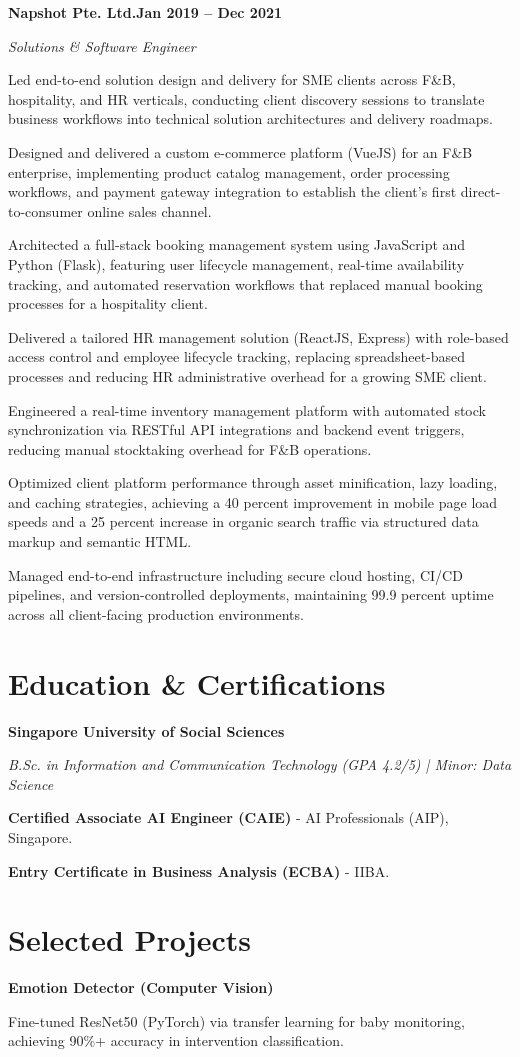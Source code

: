 \documentclass[letterpaper,10pt]{article}
\newcommand{\headingBf}[2]{\par\noindent\hspace*{10pt}\textbf{#1}\hfill\textbf{#2}}
\newcommand{\headingIt}[2]{\par\noindent\hspace*{10pt}\textit{#1}\hfill\textit{#2}}
\newenvironment{resume_list}{\vspace{-7pt}\begin{itemize}[itemsep=-2px, parsep=1pt, leftmargin=30pt]}{\end{itemize}}
\begin{document}
  \headingBf{Napshot Pte. Ltd.}{Jan 2019 -- Dec 2021}
  \headingIt{Solutions \& Software Engineer}{}
  \begin{resume_list}
    \item Led end-to-end solution design and delivery for SME clients across F\&B, hospitality, and HR verticals, conducting client discovery sessions to translate business workflows into technical solution architectures and delivery roadmaps.
    \item Designed and delivered a custom e-commerce platform (VueJS) for an F\&B enterprise, implementing product catalog management, order processing workflows, and payment gateway integration to establish the client's first direct-to-consumer online sales channel.
    \item Architected a full-stack booking management system using JavaScript and Python (Flask), featuring user lifecycle management, real-time availability tracking, and automated reservation workflows that replaced manual booking processes for a hospitality client.
    \item Delivered a tailored HR management solution (ReactJS, Express) with role-based access control and employee lifecycle tracking, replacing spreadsheet-based processes and reducing HR administrative overhead for a growing SME client.
    \item Engineered a real-time inventory management platform with automated stock synchronization via RESTful API integrations and backend event triggers, reducing manual stocktaking overhead for F\&B operations.
    \item Optimized client platform performance through asset minification, lazy loading, and caching strategies, achieving a 40 percent improvement in mobile page load speeds and a 25 percent increase in organic search traffic via structured data markup and semantic HTML.
    \item Managed end-to-end infrastructure including secure cloud hosting, CI/CD pipelines, and version-controlled deployments, maintaining 99.9 percent uptime across all client-facing production environments.
  \end{resume_list}

  \section{Education \& Certifications}
  \headingBf{Singapore University of Social Sciences}{}
  \headingIt{B.Sc. in Information and Communication Technology (GPA 4.2/5) | Minor: Data Science}{}
  \begin{resume_list}
    \item \textbf{Certified Associate AI Engineer (CAIE)} - AI Professionals (AIP), Singapore.
    \item \textbf{Entry Certificate in Business Analysis (ECBA)} - IIBA.
  \end{resume_list}

  \section{Selected Projects}
  \headingBf{Emotion Detector (Computer Vision)}{}
  \begin{resume_list}
    \item Fine-tuned ResNet50 (PyTorch) via transfer learning for baby monitoring, achieving 90\%+ accuracy in intervention classification.
  \end{resume_list}
\end{document}
